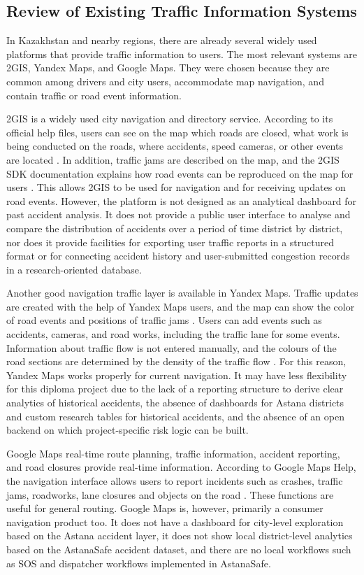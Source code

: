 ﻿\documentclass[12pt,a4paper]{report}
\begin{document}
\subsection{Review of Existing Traffic Information Systems}

In Kazakhstan and nearby regions, there are already several widely used platforms that provide traffic information to users. The most relevant systems are 2GIS, Yandex Maps, and Google Maps. They were chosen because they are common among drivers and city users, accommodate map navigation, and contain traffic or road event information.

2GIS is a widely used city navigation and directory service. According to its official help files, users can see on the map which roads are closed, what work is being conducted on the roads, where accidents, speed cameras, or other events are located \cite{twogisHelp}. In addition, traffic jams are described on the map, and the 2GIS SDK documentation explains how road events can be reproduced on the map for users \cite{twogisHelp}. This allows 2GIS to be used for navigation and for receiving updates on road events. However, the platform is not designed as an analytical dashboard for past accident analysis. It does not provide a public user interface to analyse and compare the distribution of accidents over a period of time district by district, nor does it provide facilities for exporting user traffic reports in a structured format or for connecting accident history and user-submitted congestion records in a research-oriented database.

Another good navigation traffic layer is available in Yandex Maps. Traffic updates are created with the help of Yandex Maps users, and the map can show the color of road events and positions of traffic jams \cite{yandexMapsHelp}. Users can add events such as accidents, cameras, and road works, including the traffic lane for some events. Information about traffic flow is not entered manually, and the colours of the road sections are determined by the density of the traffic flow \cite{yandexMapsHelp}. For this reason, Yandex Maps works properly for current navigation. It may have less flexibility for this diploma project due to the lack of a reporting structure to derive clear analytics of historical accidents, the absence of dashboards for Astana districts and custom research tables for historical accidents, and the absence of an open backend on which project-specific risk logic can be built.

Google Maps real-time route planning, traffic information, accident reporting, and road closures provide real-time information. According to Google Maps Help, the navigation interface allows users to report incidents such as crashes, traffic jams, roadworks, lane closures and objects on the road \cite{googleMapsNavigation}. These functions are useful for general routing. Google Maps is, however, primarily a consumer navigation product too. It does not have a dashboard for city-level exploration based on the Astana accident layer, it does not show local district-level analytics based on the AstanaSafe accident dataset, and there are no local workflows such as SOS and dispatcher workflows implemented in AstanaSafe.
\end{document}
